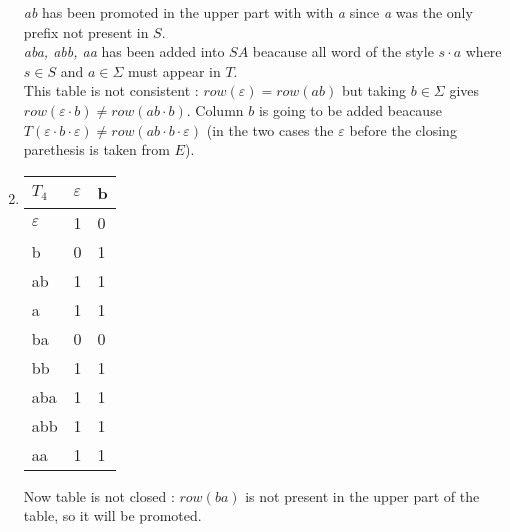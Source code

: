 \begin{enumerate}
\begin{minipage}{0.3\textwidth}
\begin{tabular}{l||l}
          \end{tabular}
        \end{minipage} \quad
        \begin{minipage}{0.5\textwidth}
          \textit{ab} has been promoted in the upper part with with \textit{a} since \textit{a} was the only prefix not present in $S$.\\
          \textit{aba, abb, aa} has been added into $SA$ beacause all word of the style $s \cdot a$ where $s \in S$ and $a \in \Sigma$ must appear in $T$.\\
          This table is not consistent : $row(\varepsilon) = row(ab)$ but taking $b \in \Sigma$ gives $row(\varepsilon \cdot b) \neq row(ab \cdot b)$. Column $b$ is going to be added beacause $T(\varepsilon \cdot b \cdot \varepsilon) \neq row(ab \cdot b \cdot \varepsilon)$ (in the two cases the $\varepsilon$ before the closing parethesis is taken from $E$).
        \end{minipage}

  \item \begin{minipage}{0.3\textwidth}
          \begin{tabular}{l||l|l}
            $T_4$         & $\varepsilon$ & b \\
            \hline\hline
            $\varepsilon$ & 1             & 0 \\
            b             & 0             & 1 \\
            ab            & 1             & 1 \\
            a             & 1             & 1 \\
            \hline\hline
            ba            & 0             & 0 \\
            bb            & 1             & 1 \\
            aba           & 1             & 1 \\
            abb           & 1             & 1 \\
            aa            & 1             & 1 \\
          \end{tabular}
        \end{minipage} \quad
        \begin{minipage}{0.5\textwidth}
          Now table is not closed : $row(ba)$ is not present in the upper part of the table, so it will be promoted.
        \end{minipage}


\end{enumerate}
